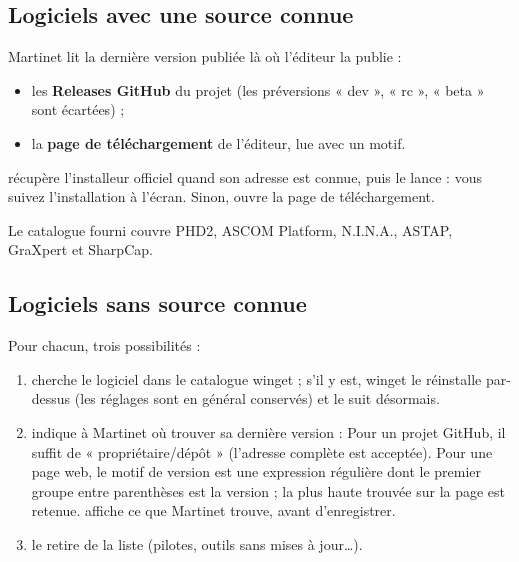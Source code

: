 
\subsection{Logiciels avec une source connue}

Martinet lit la dernière version publiée là où l'éditeur la publie :
\begin{itemize}
\item les \textbf{Releases GitHub} du projet (les préversions « dev », « rc », « beta » sont écartées) ;
\item la \textbf{page de téléchargement} de l'éditeur, lue avec un motif.
\end{itemize}
 récupère l'installeur officiel quand son adresse est connue, puis le
lance : vous suivez l'installation à l'écran. Sinon,  ouvre la page de
téléchargement.

Le catalogue fourni couvre PHD2, ASCOM Platform, N.I.N.A., ASTAP, GraXpert et SharpCap.

\subsection{Logiciels sans source connue}

Pour chacun, trois possibilités :
\begin{enumerate}
\item {} cherche le logiciel dans le catalogue winget ; s'il y est, winget le
réinstalle par-dessus (les réglages sont en général conservés) et le suit désormais.
\item {} indique à Martinet où trouver sa dernière version :
Pour un projet GitHub, il suffit de « propriétaire/dépôt » (l'adresse complète est acceptée). Pour une
page web, le motif de version est une expression régulière dont le premier groupe entre parenthèses
est la version ; la plus haute trouvée sur la page est retenue.  affiche ce que Martinet
trouve, avant d'enregistrer.
\item {} le retire de la liste (pilotes, outils sans mises à jour…).
\end{enumerate}


